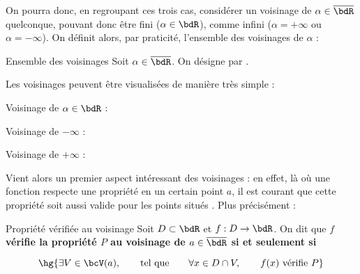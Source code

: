 \documentclass[a4paper,french,bookmarks]{article}
\begin{document}
On pourra donc, en regroupant ces trois cas, considérer un voisinage de $\alpha \in \overline\bdR$ quelconque, pouvant donc être fini ($\alpha \in \bdR$), comme infini ($\alpha = +\infty$ ou $\alpha = -\infty$). On définit alors, par praticité, l'ensemble des voisinages de $\alpha$ :

\begin{definition}{Ensemble des voisinages}{}
    Soit $\alpha \in \overline\bdR$. On désigne par .
\end{definition}

Les voisinages peuvent être visualisées de manière très simple :

\begin{center}
\begin{minipage}{0.3\linewidth}
    \centering
    
    Voisinage de $\alpha \in \bdR$ :
    
\end{minipage}
\begin{minipage}{0.03\linewidth}
\hfill
\end{minipage}
\begin{minipage}{0.3\linewidth}
    \center
    Voisinage de $-\infty$ :
    
\end{minipage}
\begin{minipage}{0.03\linewidth}
\hfill
\end{minipage}
\begin{minipage}{0.3\linewidth}
    Voisinage de $+\infty$ :
    
\end{minipage}
\end{center}

Vient alors un premier aspect intéressant des voisinages : en effet, là où une fonction respecte une propriété en un certain point $a$, il est courant que cette propriété soit aussi valide pour les points situés . Plus précisément :

\begin{definition}{Propriété vérifiée au voisinage}{}
    Soit $D \subset \bdR$ et $f: D \to \bdR$. On dit que \bf{$f$ vérifie la propriété $P$ au voisinage de $a \in \overline\bdR$} si et seulement si
    
    \[ \hg{\exists V \in \bcV(a), \qquad \text{tel que} \qquad \forall x \in D \cap V, \qquad f(x) \ \text{vérifie} \ P}\]
\end{definition}
\end{document}
